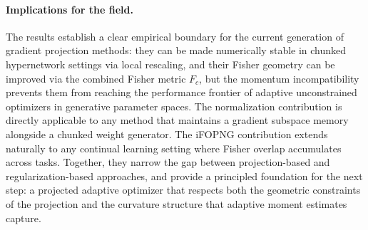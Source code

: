 \paragraph{Implications for the field.}
The results establish a clear empirical boundary for the current generation
of gradient projection methods: they can be made numerically stable in
chunked hypernetwork settings via local rescaling, and their Fisher geometry
can be improved via the combined Fisher metric $F_c$, but the momentum incompatibility
prevents them from reaching the performance frontier of adaptive
unconstrained optimizers in generative parameter spaces.
The normalization contribution is directly applicable to any method that
maintains a gradient subspace memory alongside a chunked weight generator.
The iFOPNG contribution extends naturally to any continual learning
setting where Fisher overlap accumulates across tasks.
Together, they narrow the gap between projection-based and
regularization-based approaches, and provide a principled foundation for
the next step: a projected adaptive optimizer that respects both the
geometric constraints of the projection and the curvature structure that
adaptive moment estimates capture.
